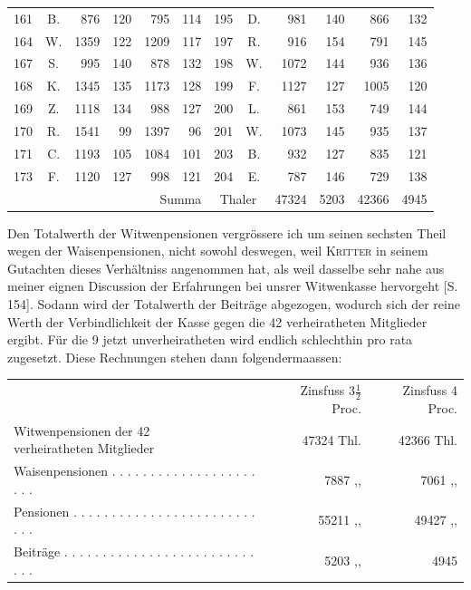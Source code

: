 \begin{center}
\begin{tabular}{r|c|r|r|r|r||r|c|r|r|r|r}
161&B.&876&120&795&114&195&D.&981&140&866&132\\
164&W.&1359&122&1209&117&197&R.&916&154&791&145\\
167&S.&995&140&878&132&198&W.&1072&144&936&136\\
168&K.&1345&135&1173&128&199&F.&1127&127&1005&120\\
169&Z.&1118&134&988&127&200&L.&861&153&749&144\\
170&R.&1541&99&1397&96&201&W.&1073&145&935&137\\
171&C.&1193&105&1084&101&203&B.&932&127&835&121\\
173&F.&1120&127&998&121&204&E.&787&146&729&138\\\cline{6-12}
\multicolumn{6}{r}{Summa}&\multicolumn{2}{c|}{Thaler}&47324&5203&42366&4945
\end{tabular}
\end{center}
\noindent\hspace*{\parindent}Den Totalwerth der Witwenpensionen vergrössere ich um seinen sechsten Theil wegen der Waisenpensionen, nicht sowohl deswegen, weil \textsc{Kritter} in seinem Gutachten dieses Verhältniss angenommen hat, als weil dasselbe sehr nahe aus meiner eignen Discussion der Erfahrungen bei unsrer Witwenkasse hervorgeht [S. 154]. Sodann wird der Totalwerth der Beiträge abgezogen, wodurch sich der reine Werth der Verbindlichkeit der Kasse gegen die 42 verheiratheten Mitglieder ergibt. Für die 9 jetzt unverheiratheten wird endlich schlechthin pro rata zugesetzt. Diese Rechnungen stehen dann folgendermaassen:
\begin{center}
\footnotesize\setlength{\tabcolsep}{3pt}
\begin{tabular}{l r|r}
&Zinsfuss \(3\tfrac{1}{2}\) Proc.&Zinsfuss 4 Proc.\\
\shortstack[l]{Witwenpensionen der 42\\verheiratheten Mitglieder}&47324 Thl.&42366 Thl.\\
Waisenpensionen . . . . . . . . . . . . . . . . . . . . . .&7887 ,, &7061 ,, \\[5pt]
Pensionen . . . . . . . . . . . . . . . . . . . . . . . . . . .&55211 ,, &49427 ,, \\
Beiträge . . . . . . . . . . . . . . . . . . . . . . . . . . . .&5203 ,, &4945
\end{tabular}
\end{center}
